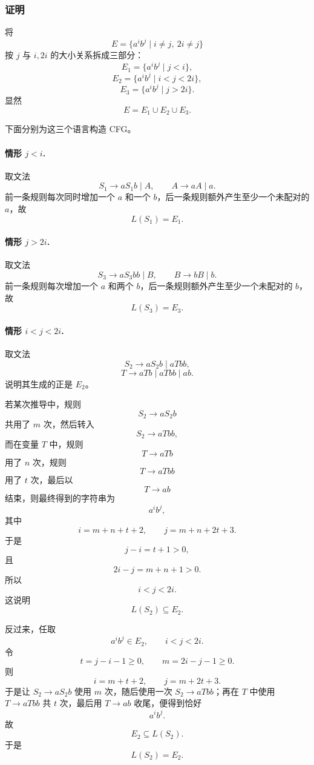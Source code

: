 \begin{answerred}
\subsubsection*{证明}

将
\[
    E=\{a^i b^j\mid i\ne j,\ 2i\ne j\}
\]
按 $j$ 与 $i,2i$ 的大小关系拆成三部分：
\[
    E_1=\{a^i b^j\mid j<i\},
\]
\[
    E_2=\{a^i b^j\mid i<j<2i\},
\]
\[
    E_3=\{a^i b^j\mid j>2i\}.
\]
显然
\[
    E=E_1\cup E_2\cup E_3.
\]

下面分别为这三个语言构造 CFG。

\paragraph{情形 $j<i$.}
取文法
\[
    S_1\to aS_1b\mid A,
    \qquad
    A\to aA\mid a.
\]
前一条规则每次同时增加一个 $a$ 和一个 $b$，后一条规则额外产生至少一个未配对的 $a$，故
\[
    L(S_1)=E_1.
\]

\paragraph{情形 $j>2i$.}
取文法
\[
    S_3\to aS_3bb\mid B,
    \qquad
    B\to bB\mid b.
\]
前一条规则每次增加一个 $a$ 和两个 $b$，后一条规则额外产生至少一个未配对的 $b$，故
\[
    L(S_3)=E_3.
\]

\paragraph{情形 $i<j<2i$.}
取文法
\[
    S_2\to aS_2b\mid aTbb,
\]
\[
    T\to aTb\mid aTbb\mid ab.
\]
说明其生成的正是 $E_2$。

若某次推导中，规则
\[
    S_2\to aS_2b
\]
共用了 $m$ 次，然后转入
\[
    S_2\to aTbb,
\]
而在变量 $T$ 中，规则
\[
    T\to aTb
\]
用了 $n$ 次，规则
\[
    T\to aTbb
\]
用了 $t$ 次，最后以
\[
    T\to ab
\]
结束，则最终得到的字符串为
\[
    a^i b^j,
\]
其中
\[
    i=m+n+t+2,
    \qquad
    j=m+n+2t+3.
\]
于是
\[
    j-i=t+1>0,
\]
且
\[
    2i-j=m+n+1>0.
\]
所以
\[
    i<j<2i.
\]
这说明
\[
    L(S_2)\subseteq E_2.
\]

反过来，任取
\[
    a^i b^j\in E_2,
    \qquad i<j<2i.
\]
令
\[
    t=j-i-1\ge 0,
    \qquad
    m=2i-j-1\ge 0.
\]
则
\[
    i=m+t+2,
    \qquad
    j=m+2t+3.
\]
于是让 $S_2\to aS_2b$ 使用 $m$ 次，随后使用一次 $S_2\to aTbb$；再在 $T$ 中使用 $T\to aTbb$ 共 $t$ 次，最后用 $T\to ab$ 收尾，便得到恰好
\[
    a^i b^j.
\]
故
\[
    E_2\subseteq L(S_2).
\]
于是
\[
    L(S_2)=E_2.
\]


\end{answerred}
